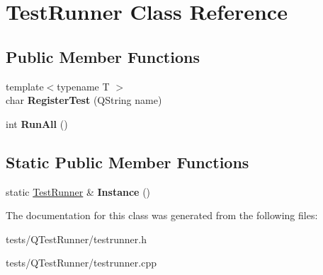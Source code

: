 \hypertarget{classTestRunner}{}\section{Test\+Runner Class Reference}
\label{classTestRunner}
\subsection*{Public Member Functions}
\begin{DoxyCompactItemize}
\item 
\hypertarget{classTestRunner_affb5703febccf285914b08ce39e7396f}{}{\footnotesize template$<$typename T $>$ }\\char {\bfseries Register\+Test} (Q\+String name)\label{classTestRunner_affb5703febccf285914b08ce39e7396f}

\item 
\hypertarget{classTestRunner_a10db57abd545dd4f9b93e7aeaae55e4c}{}int {\bfseries Run\+All} ()\label{classTestRunner_a10db57abd545dd4f9b93e7aeaae55e4c}

\end{DoxyCompactItemize}
\subsection*{Static Public Member Functions}
\begin{DoxyCompactItemize}
\item 
\hypertarget{classTestRunner_a4707c4680c85ce622fc375efcf39fc25}{}static \hyperlink{classTestRunner}{Test\+Runner} \& {\bfseries Instance} ()\label{classTestRunner_a4707c4680c85ce622fc375efcf39fc25}

\end{DoxyCompactItemize}


The documentation for this class was generated from the following files\+:\begin{DoxyCompactItemize}
\item 
tests/\+Q\+Test\+Runner/testrunner.\+h\item 
tests/\+Q\+Test\+Runner/testrunner.\+cpp\end{DoxyCompactItemize}
